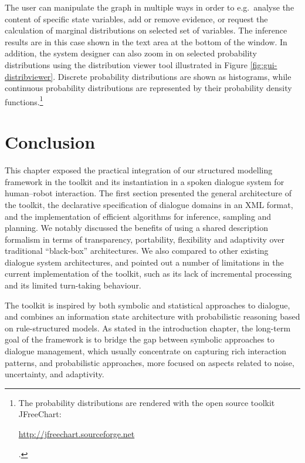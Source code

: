 The user can manipulate the graph in multiple ways in order to e.g.\ analyse the content of specific state variables, add or remove evidence, or request the calculation of marginal distributions on selected set of variables.  The inference results are in this case shown in the text area at the bottom of the window.  In addition, the system designer can also zoom in on selected probability distributions using the distribution viewer tool illustrated in Figure \ref{fig:gui-distribviewer}. Discrete probability distributions are shown as histograms, while continuous probability distributions are represented by their probability density functions.\footnote{The probability distributions are rendered with the open source toolkit JFreeChart: \begin{scriptsize}\url{http://jfreechart.sourceforge.net}\end{scriptsize}.} 


\section{Conclusion}

This chapter exposed the practical integration of our structured modelling framework in the \opendial{} toolkit and its instantiation in a spoken dialogue system for human--robot interaction. The first section presented the general architecture of the toolkit, the declarative specification of dialogue domains in an XML format, and the implementation of efficient algorithms for inference, sampling and planning. We notably discussed the benefits of using a shared description formalism in terms of transparency, portability, flexibility and adaptivity over traditional ``black-box'' architectures. We also compared \opendial{} to other existing dialogue system architectures, and pointed out a number of limitations in the current implementation of the toolkit, such as its lack of incremental processing and its limited turn-taking behaviour. 

The \opendial{} toolkit is inspired by both symbolic and statistical approaches to dialogue, and combines an information state architecture with probabilistic reasoning based on rule-structured models.  As stated in the introduction chapter, the long-term goal of the \opendial{} framework is to bridge the gap between symbolic approaches to dialogue management, which usually concentrate on capturing rich interaction patterns, and probabilistic approaches, more focused on aspects related to noise, uncertainty, and adaptivity. 

